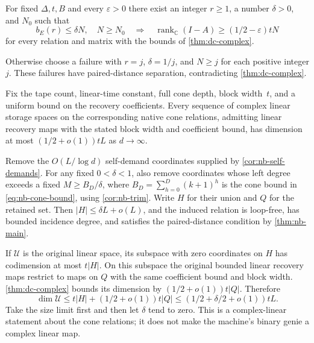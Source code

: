 \begin{corollary}
\notformalized
\label{cor:dc-uniform}
For fixed $\Delta,t,B$ and every $\varepsilon>0$ there exist an integer
$r\ge1$, a number $\delta>0$, and $N_0$ such that
\[
 b_E(r)\le\delta N,\quad N\ge N_0
 \quad\Longrightarrow\quad
 \operatorname{rank}_{\mathbb C}(I-A)\ge(1/2-\varepsilon)tN
\]
for every relation and matrix with the bounds of \cref{thm:dc-complex}.
\end{corollary}
\begin{informalproof}
Otherwise choose a failure with $r=j$, $\delta=1/j$, and $N\ge j$
for each positive integer $j$.  These failures have paired-distance separation,
contradicting \cref{thm:dc-complex}.
\end{informalproof}

\begin{corollary}
\notformalized
\label{cor:dc-native}
Fix the tape count, linear-time constant, full cone depth, block width~$t$,
and a uniform bound on the recovery coefficients.  Every sequence of
complex linear storage spaces on the corresponding native cone relations,
admitting linear recovery maps with the stated block width and coefficient
bound, has dimension at most $(1/2+o(1))tL$ as $d\to\infty$.
\end{corollary}
\begin{informalproof}
Remove the $O(L/\log d)$ self-demand coordinates supplied by
\cref{cor:nb-self-demands}.  For any fixed $0<\delta<1$, also remove
coordinates whose left degree exceeds a fixed $M\ge B_D/\delta$, where
$B_D=\sum_{h=0}^D(k+1)^h$ is the cone bound in
\eqref{eq:nb-cone-bound}, using
\cref{cor:nb-trim}.  Write $H$ for their union and $Q$ for the
retained set.  Then $|H|\le\delta L+o(L)$, and the induced relation is
loop-free, has bounded incidence degree, and satisfies the paired-distance
condition by \cref{thm:nb-main}.

If $\mathcal U$ is the original linear space, its subspace with zero
coordinates on $H$ has codimension at most $t|H|$.  On this subspace the
original bounded linear recovery maps restrict to maps on $Q$ with the
same coefficient bound and block width.  \cref{thm:dc-complex} bounds
its dimension by $(1/2+o(1))t|Q|$.  Therefore
\[
 \dim\mathcal U\le t|H|+(1/2+o(1))t|Q|
 \le(1/2+\delta/2+o(1))tL.
\]
Take the size limit first and then let $\delta$ tend to zero.  This is a
complex-linear statement about the cone relations; it does not make the
machine's binary genie a complex linear map.
\end{informalproof}

